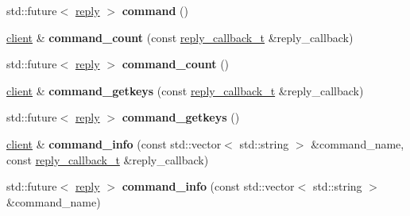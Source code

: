 \begin{DoxyCompactItemize}
\item 
\mbox{\label{classcpp__redis_1_1client_a93ef2e84647990d02aa67a1e22341b38}} 
std\+::future$<$ \hyperlink{classcpp__redis_1_1reply}{reply} $>$ {\bfseries command} ()
\item 
\mbox{\label{classcpp__redis_1_1client_a639c7fd5c7899ba474e65513ee337bea}} 
\hyperlink{classcpp__redis_1_1client}{client} \& {\bfseries command\+\_\+count} (const \hyperlink{classcpp__redis_1_1client_a061a1140d36d2eaeda82b09a0bb3f9f2}{reply\+\_\+callback\+\_\+t} \&reply\+\_\+callback)
\item 
\mbox{\label{classcpp__redis_1_1client_af0cac37a62edbd7d699b379551f1ef9a}} 
std\+::future$<$ \hyperlink{classcpp__redis_1_1reply}{reply} $>$ {\bfseries command\+\_\+count} ()
\item 
\mbox{\label{classcpp__redis_1_1client_a3d23ff98ee82a404373d75b660720926}} 
\hyperlink{classcpp__redis_1_1client}{client} \& {\bfseries command\+\_\+getkeys} (const \hyperlink{classcpp__redis_1_1client_a061a1140d36d2eaeda82b09a0bb3f9f2}{reply\+\_\+callback\+\_\+t} \&reply\+\_\+callback)
\item 
\mbox{\label{classcpp__redis_1_1client_a18ab313316e99ab0a690540f40de80e3}} 
std\+::future$<$ \hyperlink{classcpp__redis_1_1reply}{reply} $>$ {\bfseries command\+\_\+getkeys} ()
\item 
\mbox{\label{classcpp__redis_1_1client_a95105c556aa5c070819bc82729d336c5}} 
\hyperlink{classcpp__redis_1_1client}{client} \& {\bfseries command\+\_\+info} (const std\+::vector$<$ std\+::string $>$ \&command\+\_\+name, const \hyperlink{classcpp__redis_1_1client_a061a1140d36d2eaeda82b09a0bb3f9f2}{reply\+\_\+callback\+\_\+t} \&reply\+\_\+callback)
\item 
\mbox{\label{classcpp__redis_1_1client_abd02a4d296ed0c160e935cd176862334}} 
std\+::future$<$ \hyperlink{classcpp__redis_1_1reply}{reply} $>$ {\bfseries command\+\_\+info} (const std\+::vector$<$ std\+::string $>$ \&command\+\_\+name)
\item 
\mbox{\label{classcpp__redis_1_1client_a510ede75cc6361f33a4cdd0695f7543f}} 

\end{DoxyCompactItemize}

